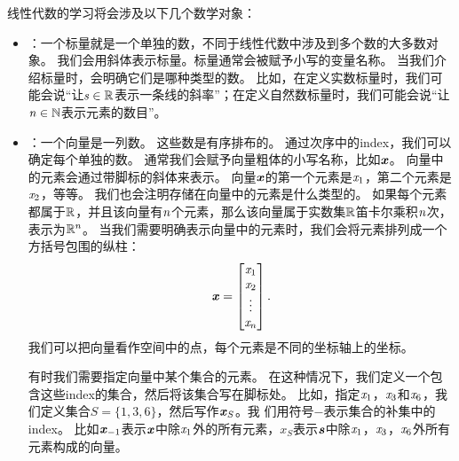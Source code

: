线性代数的学习将会涉及以下几个数学对象：
\begin{itemize}
    \item {}：一个标量就是一个单独的数，不同于线性代数中涉及到多个数的大多数对象。
    我们会用斜体表示标量。标量通常会被赋予小写的变量名称。
    当我们介绍标量时，会明确它们是哪种类型的数。
    比如，在定义实数标量时，我们可能会说“让$\mathit{s} \in \mathbb{R}$表示一条线的斜率”；在定义自然数标量时，我们可能会说“让$\mathit{n}\in\mathbb{N}$表示元素的数目”。


    \item {}：一个向量是一列数。
    这些数是有序排布的。
    通过次序中的\gls{index}，我们可以确定每个单独的数。
    通常我们会赋予向量粗体的小写名称，比如$\boldsymbol{\mathit{x}}$。
    向量中的元素会通过带脚标的斜体来表示。
    向量$\boldsymbol{\mathit{x}}$的第一个元素是$\mathit{x}_1$，第二个元素是$\mathit{x}_2$，等等。
    我们也会注明存储在向量中的元素是什么类型的。
    如果每个元素都属于$\mathbb{R}$，并且该向量有$\mathit{n}$个元素，那么该向量属于实数集$\mathbb{R}$笛卡尔乘积$\mathit{n}$次，表示为$\mathbb{R}^n$。
    当我们需要明确表示向量中的元素时，我们会将元素排列成一个方括号包围的纵柱：
    \begin{equation}
        \boldsymbol{\mathit{x}}=\begin{bmatrix} \mathit{x}_1   \\  
                            \mathit{x}_2   \\ 
                            \vdots  \\ 
                            \mathit{x}_n 
                \end{bmatrix}.
    \end{equation}
    我们可以把向量看作空间中的点，每个元素是不同的坐标轴上的坐标。
    
    有时我们需要指定向量中某个集合的元素。
    在这种情况下，我们定义一个包含这些\gls{index}的集合，然后将该集合写在脚标处。
    比如，指定$\mathit{x}_1$，$\mathit{x}_3$和$\mathit{x}_6$，我们定义集合$S=\{1,3,6\}$，然后写作$\boldsymbol{\mathit{x}}_S$。我
    们用符号$-$表示集合的补集中的\gls{index}。
    比如$\boldsymbol{\mathit{x}}_{-1}$表示$\boldsymbol{\mathit{x}}$中除$\mathit{x}_1$外的所有元素，$x_S$表示$\boldsymbol{\mathit{s}}$中除$\mathit{x}_1$，$\mathit{x}_3$，$\mathit{x}_6$外所有元素构成的向量。


\end{itemize}
